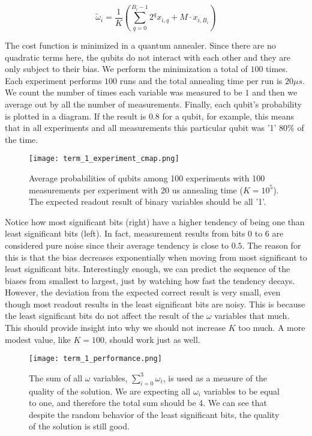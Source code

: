 \documentclass[12pt,a4paper]{report}
\begin{document}
\[
\tilde{\omega}_i = \frac{1}{K} \left( \sum_{q=0}^{B_i-1} 2^q x_{i,q} + M \cdot x_{i,B_i} \right)
\]

\noindent
The cost function is minimized in a quantum annealer. Since there are no quadratic terms here, the qubits do not interact with each other and they are only subject to their bias. We perform the minimization a total of \(100\) times. Each experiment performs \(100\) runs and the total annealing time per run is \(20 \mu s\). We count the number of times each variable was measured to be \(1\) and then we average out by all the number of measurements. Finally, each qubit's probability is plotted in a diagram. If the result is \(0.8\) for a qubit, for example, this means that in all experiments and all measurements this particular qubit was '1' \(80\%\) of the time.




\begin{figure}[!h]
    \centering
    \texttt{[image: term\_1\_experiment\_cmap.png]} 
    \caption{Average probabilities of qubits among 100 experiments with 100 measurements per experiment with 20 us annealing time (\(K=10^5\)). The expected readout result of binary variables should be all '1'.}
    \label{fig:cmap_term_1}
\end{figure}

\newpage

\noindent
Notice how most significant bits (right) have a higher tendency of being one than least significant bits (left). In fact, measurement results from bits \(0\) to \(6\) are considered pure noise since their average tendency is close to \(0.5\). The reason for this is that the bias decreases exponentially when moving from most significant to least significant bits. Interestingly enough, we can predict the sequence of the biases from smallest to largest, just by watching how fast the tendency decays. However, the deviation from the expected correct result is very small, even though most readout results in the least significant bits are noisy. This is because the least significant bits do not affect the result of the \(\omega\) variables that much. This should provide insight into why we should not increase \(K\) too much. A more modest value, like \(K=100\), should work just as well.

\begin{figure}[h]
    \centering
    \texttt{[image: term\_1\_performance.png]} 
    \caption{The sum of all \(\omega\) variables, \(\sum_{i=0}^{3} \omega_i\), is used as a measure of the quality of the solution. We are expecting all \(\omega_i\) variables to be equal to one, and therefore the total sum should be 4. We can see that despite the random behavior of the least significant bits, the quality of the solution is still good.}
    \label{fig:per_term_1}
\end{figure}
\end{document}
